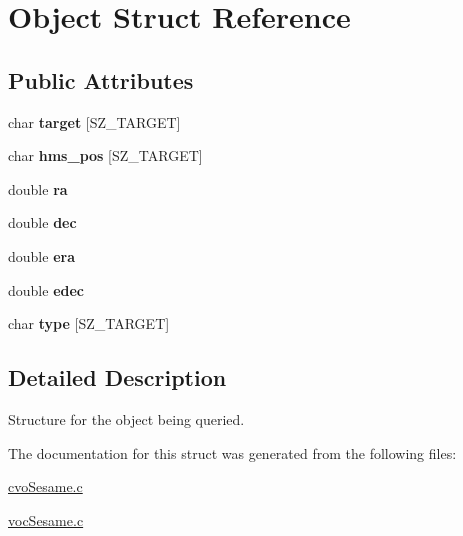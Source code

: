 \hypertarget{structObject}{
\section{Object Struct Reference}
\label{structObject}
}
\subsection*{Public Attributes}
\begin{CompactItemize}
\item 
\hypertarget{structObject_6916edad0d205c6fd55ef5c8eb7fca40}{
char \textbf{target} \mbox{[}SZ\_\-TARGET\mbox{]}}
\label{structObject_6916edad0d205c6fd55ef5c8eb7fca40}

\item 
\hypertarget{structObject_f1be9e585c777600a56b004690c72e0f}{
char \textbf{hms\_\-pos} \mbox{[}SZ\_\-TARGET\mbox{]}}
\label{structObject_f1be9e585c777600a56b004690c72e0f}

\item 
\hypertarget{structObject_4d7b960d76d5ea50bb92efedc3c68878}{
double \textbf{ra}}
\label{structObject_4d7b960d76d5ea50bb92efedc3c68878}

\item 
\hypertarget{structObject_a6e49034ae594ec8685489ea90cc2bac}{
double \textbf{dec}}
\label{structObject_a6e49034ae594ec8685489ea90cc2bac}

\item 
\hypertarget{structObject_2cb904c8ddcab5a9e3a9d3eca0e29083}{
double \textbf{era}}
\label{structObject_2cb904c8ddcab5a9e3a9d3eca0e29083}

\item 
\hypertarget{structObject_f5a95e66e7737fb043264861e9a251f2}{
double \textbf{edec}}
\label{structObject_f5a95e66e7737fb043264861e9a251f2}

\item 
\hypertarget{structObject_5a6d84ee1451d8c8302847210eb839a0}{
char \textbf{type} \mbox{[}SZ\_\-TARGET\mbox{]}}
\label{structObject_5a6d84ee1451d8c8302847210eb839a0}

\end{CompactItemize}


\subsection{Detailed Description}
Structure for the object being queried. 

The documentation for this struct was generated from the following files:\begin{CompactItemize}
\item 
\hyperlink{cvoSesame_8c}{cvoSesame.c}\item 
\hyperlink{vocSesame_8c}{vocSesame.c}\end{CompactItemize}
